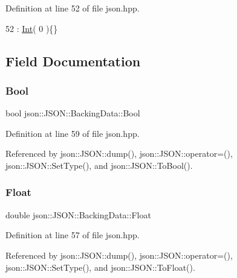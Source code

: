 Definition at line 52 of file json.\+hpp.


\begin{DoxyCode}
52 : \mbox{\hyperlink{unionjson_1_1_j_s_o_n_1_1_backing_data_a0d80815a70ff5bb9345f75de79ec81c3}{Int}}( 0 )\{\}
\end{DoxyCode}


\subsection{Field Documentation}
\mbox{\label{unionjson_1_1_j_s_o_n_1_1_backing_data_a0659fafaedb7de535ae3e79e4ff4688c}} 
\subsubsection{\texorpdfstring{Bool}{Bool}}
{\footnotesize\ttfamily bool json\+::\+J\+S\+O\+N\+::\+Backing\+Data\+::\+Bool}



Definition at line 59 of file json.\+hpp.



Referenced by json\+::\+J\+S\+O\+N\+::dump(), json\+::\+J\+S\+O\+N\+::operator=(), json\+::\+J\+S\+O\+N\+::\+Set\+Type(), and json\+::\+J\+S\+O\+N\+::\+To\+Bool().

\mbox{\label{unionjson_1_1_j_s_o_n_1_1_backing_data_aac4950afa6b9205bb367a33de47faa5c}} 
\subsubsection{\texorpdfstring{Float}{Float}}
{\footnotesize\ttfamily double json\+::\+J\+S\+O\+N\+::\+Backing\+Data\+::\+Float}



Definition at line 57 of file json.\+hpp.



Referenced by json\+::\+J\+S\+O\+N\+::dump(), json\+::\+J\+S\+O\+N\+::operator=(), json\+::\+J\+S\+O\+N\+::\+Set\+Type(), and json\+::\+J\+S\+O\+N\+::\+To\+Float().

